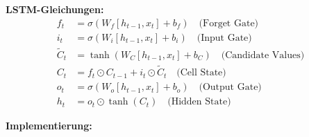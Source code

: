 ﻿\documentclass[12pt,a4paper]{article}
\begin{document}
\textbf{LSTM-Gleichungen:}
\begin{align}
f_t &= \sigma(W_f [h_{t-1}, x_t] + b_f) \quad \text{(Forget Gate)} \\
i_t &= \sigma(W_i [h_{t-1}, x_t] + b_i) \quad \text{(Input Gate)} \\
\tilde{C}_t &= \tanh(W_C [h_{t-1}, x_t] + b_C) \quad \text{(Candidate Values)} \\
C_t &= f_t \odot C_{t-1} + i_t \odot \tilde{C}_t \quad \text{(Cell State)} \\
o_t &= \sigma(W_o [h_{t-1}, x_t] + b_o) \quad \text{(Output Gate)} \\
h_t &= o_t \odot \tanh(C_t) \quad \text{(Hidden State)}
\end{align}

\textbf{Implementierung:}
\end{document}
